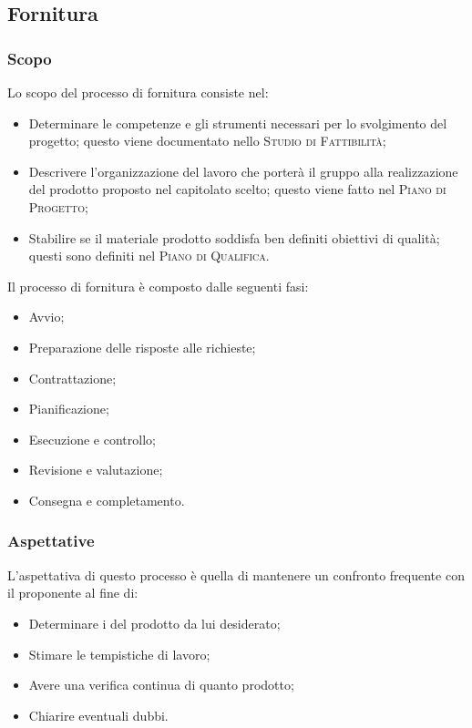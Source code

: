 \documentclass[../norme-di-progetto.tex]{subfiles}
\begin{document}

\subsection{Fornitura}
\subsubsection{Scopo}
Lo scopo del processo di fornitura consiste nel:
\begin{itemize}
  \item Determinare le competenze e gli strumenti necessari per lo svolgimento del progetto; questo viene documentato nello \textsc{Studio di Fattibilità};
  \item Descrivere l'organizzazione del lavoro che porterà il gruppo alla realizzazione del prodotto proposto nel capitolato scelto; questo viene fatto nel \textsc{Piano di Progetto};
  \item Stabilire se il materiale prodotto soddisfa ben definiti obiettivi di qualità; questi sono definiti nel \textsc{Piano di Qualifica}.
\end{itemize}
Il processo di fornitura è composto dalle seguenti fasi:
\begin{itemize}
  \item Avvio;
  \item Preparazione delle risposte alle richieste;
  \item Contrattazione;
  \item Pianificazione;
  \item Esecuzione e controllo;
  \item Revisione e valutazione;
  \item Consegna e completamento.
\end{itemize}

\subsubsection{Aspettative}
L'aspettativa di questo processo è quella di mantenere un confronto frequente con il proponente al fine di:
\begin{itemize}
  \item Determinare i  del prodotto da lui desiderato;
  \item Stimare le tempistiche di lavoro;
  \item Avere una verifica continua di quanto prodotto;
  \item Chiarire eventuali dubbi.
\end{itemize}
\end{document}
